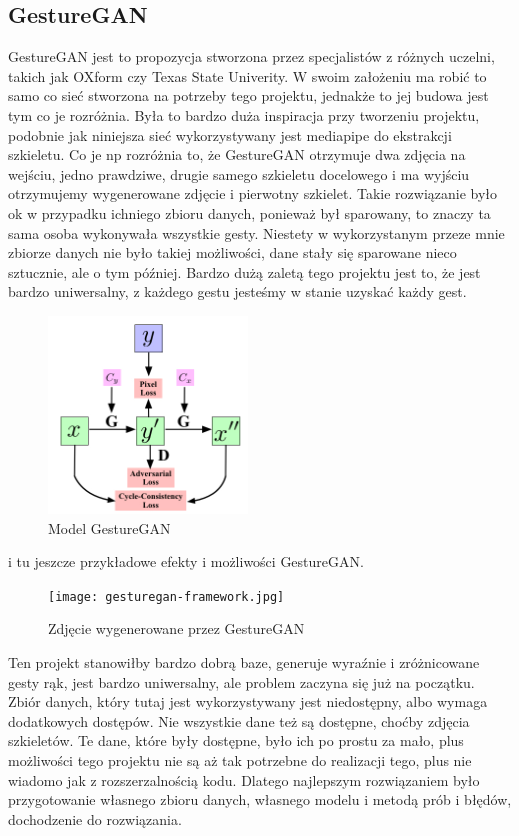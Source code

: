 \documentclass[12pt]{article}
\begin{document}
\begin{sloppypar}
{  \subsection{GestureGAN}
  {
    GestureGAN\cite{gesture-gan} jest to propozycja stworzona przez specjalistów z różnych uczelni, takich jak OXform czy Texas State Univerity.
    W swoim założeniu ma robić to samo co sieć stworzona na potrzeby tego projektu, jednakże to jej budowa jest tym co je rozróżnia.
    Była to bardzo duża inspiracja przy tworzeniu projektu, podobnie jak niniejsza sieć wykorzystywany jest mediapipe do ekstrakcji szkieletu. 
    Co je np rozróżnia to, że GestureGAN otrzymuje dwa zdjęcia na wejściu, jedno prawdziwe, drugie samego szkieletu docelowego i ma wyjściu otrzymujemy wygenerowane zdjęcie i pierwotny szkielet.
    Takie rozwiązanie było ok w przypadku ichniego zbioru danych, ponieważ był sparowany, to znaczy ta sama osoba wykonywała wszystkie gesty. 
    Niestety w wykorzystanym przeze mnie zbiorze danych nie było takiej możliwości, dane stały się sparowane nieco sztucznie, ale o tym później.
    Bardzo dużą zaletą tego projektu jest to, że jest bardzo uniwersalny, z każdego gestu jesteśmy w stanie uzyskać każdy gest.
    \begin{figure}[H]
      \centering
      \includegraphics{gesture-gan.png}
      \caption{Model GestureGAN \cite{gesture-gan}}
      \label{fig:gesture-gan-budowa}
    \end{figure}
    i tu jeszcze przykładowe efekty i możliwości GestureGAN\cite{gesture-gan}.
    \begin{figure}[H]
      \centering
      \texttt{[image: gesturegan-framework.jpg]}
      \caption{Zdjęcie wygenerowane przez GestureGAN \cite{gesture-gan}}
      \label{fig:gesture-gan-przyklady}
    \end{figure}
    Ten projekt stanowiłby bardzo dobrą baze, generuje wyraźnie i zróżnicowane gesty rąk, jest bardzo uniwersalny, ale problem zaczyna się już na początku.
    Zbiór danych, który tutaj jest wykorzystywany jest niedostępny, albo wymaga dodatkowych dostępów. Nie wszystkie dane też są dostępne, choćby zdjęcia szkieletów.
    Te dane, które były dostępne, było ich po prostu za mało, plus możliwości tego projektu nie są aż tak potrzebne do realizacji tego, plus nie wiadomo jak z rozszerzalnością kodu.
    Dlatego najlepszym rozwiązaniem było przygotowanie własnego zbioru danych, własnego modelu i metodą prób i błędów, dochodzenie do rozwiązania.
  }
}
\end{sloppypar}
\end{document}
